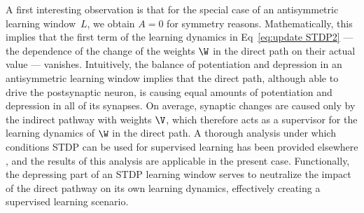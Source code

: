 A first interesting observation is that for the special case of an antisymmetric learning window~$L$, we obtain $A=0$ for symmetry reasons. Mathematically, this implies that the first term of the learning dynamics in Eq~\eqref{eq:update STDP2}  --- the dependence of the change of the weights $\W$ in the direct path on their actual value --- vanishes.
Intuitively, the balance of potentiation and depression in an antisymmetric learning window implies that the direct path, although able to drive the postsynaptic neuron, is causing equal amounts of potentiation and depression in all of its synapses. On average, synaptic changes are caused only by the indirect pathway with weights $\V$, which therefore acts as a supervisor for the learning dynamics of $\W$ in the direct path. A thorough analysis under which conditions STDP can be used for supervised learning has been provided elsewhere \cite{Legenstein2005, Pfister2006a}, and the results of this analysis are applicable in the present case. Functionally, the depressing part of an STDP learning window serves to neutralize the impact of the direct pathway on its own learning dynamics, effectively creating a supervised learning scenario.


